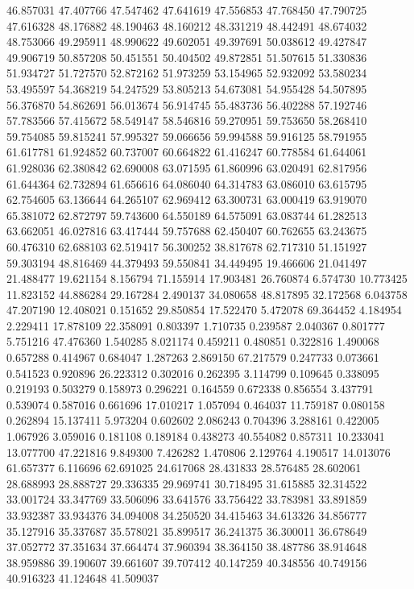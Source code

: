 46.857031
47.407766
47.547462
47.641619
47.556853
47.768450
47.790725
47.616328
48.176882
48.190463
48.160212
48.331219
48.442491
48.674032
48.753066
49.295911
48.990622
49.602051
49.397691
50.038612
49.427847
49.906719
50.857208
50.451551
50.404502
49.872851
51.507615
51.330836
51.934727
51.727570
52.872162
51.973259
53.154965
52.932092
53.580234
53.495597
54.368219
54.247529
53.805213
54.673081
54.955428
54.507895
56.376870
54.862691
56.013674
56.914745
55.483736
56.402288
57.192746
57.783566
57.415672
58.549147
58.546816
59.270951
59.753650
58.268410
59.754085
59.815241
57.995327
59.066656
59.994588
59.916125
58.791955
61.617781
61.924852
60.737007
60.664822
61.416247
60.778584
61.644061
61.928036
62.380842
62.690008
63.071595
61.860996
63.020491
62.817956
61.644364
62.732894
61.656616
64.086040
64.314783
63.086010
63.615795
62.754605
63.136644
64.265107
62.969412
63.300731
63.000419
63.919070
65.381072
62.872797
59.743600
64.550189
64.575091
63.083744
61.282513
63.662051
46.027816
63.417444
59.757688
62.450407
60.762655
63.243675
60.476310
62.688103
62.519417
56.300252
38.817678
62.717310
51.151927
59.303194
48.816469
44.379493
59.550841
34.449495
19.466606
21.041497
21.488477
19.621154
8.156794
71.155914
17.903481
26.760874
6.574730
10.773425
11.823152
44.886284
29.167284
2.490137
34.080658
48.817895
32.172568
6.043758
47.207190
12.408021
0.151652
29.850854
17.522470
5.472078
69.364452
4.184954
2.229411
17.878109
22.358091
0.803397
1.710735
0.239587
2.040367
0.801777
5.751216
47.476360
1.540285
8.021174
0.459211
0.480851
0.322816
1.490068
0.657288
0.414967
0.684047
1.287263
2.869150
67.217579
0.247733
0.073661
0.541523
0.920896
26.223312
0.302016
0.262395
3.114799
0.109645
0.338095
0.219193
0.503279
0.158973
0.296221
0.164559
0.672338
0.856554
3.437791
0.539074
0.587016
0.661696
17.010217
1.057094
0.464037
11.759187
0.080158
0.262894
15.137411
5.973204
0.602602
2.086243
0.704396
3.288161
0.422005
1.067926
3.059016
0.181108
0.189184
0.438273
40.554082
0.857311
10.233041
13.077700
47.221816
9.849300
7.426282
1.470806
2.129764
4.190517
14.013076
61.657377
6.116696
62.691025
24.617068
28.431833
28.576485
28.602061
28.688993
28.888727
29.336335
29.969741
30.718495
31.615885
32.314522
33.001724
33.347769
33.506096
33.641576
33.756422
33.783981
33.891859
33.932387
33.934376
34.094008
34.250520
34.415463
34.613326
34.856777
35.127916
35.337687
35.578021
35.899517
36.241375
36.300011
36.678649
37.052772
37.351634
37.664474
37.960394
38.364150
38.487786
38.914648
38.959886
39.190607
39.661607
39.707412
40.147259
40.348556
40.749156
40.916323
41.124648
41.509037
